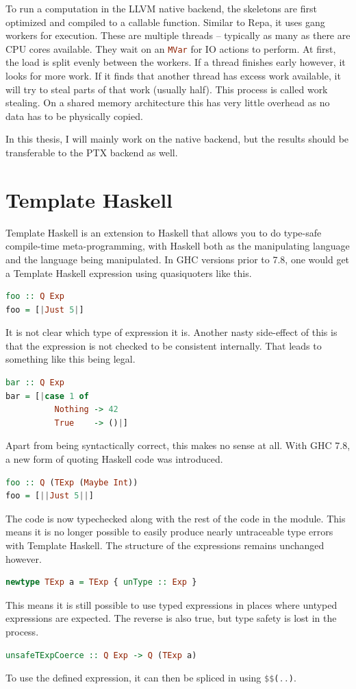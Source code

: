 \documentclass[a4paper,bibliography=totocnumbered,parskip,headsepline]{scrbook}
\begin{document}
To run a computation in the LLVM native backend, the skeletons are first optimized and compiled to a callable function.
Similar to Repa, it uses gang workers\cite{chakravarty2007data} for execution.
These are multiple threads -- typically as many as there are CPU cores available.
They wait on an \lstinline[language=haskell]!MVar! for IO actions to perform.
At first, the load is split evenly between the workers.
If a thread finishes early however, it looks for more work.
If it finds that another thread has excess work available, it will try to steal parts of that work (usually half).
This process is called work stealing.
On a shared memory architecture this has very little overhead as no data has to be physically copied.

In this thesis, I will mainly work on the native backend, but the results should be transferable to the PTX backend as well.

\section{Template Haskell}
Template Haskell is an extension to Haskell that allows you to do type-safe compile-time meta-programming, with Haskell both as the manipulating language and the language being manipulated.
In GHC versions prior to 7.8, one would get a Template Haskell expression using quasiquoters like this.
\begin{lstlisting}[language=haskell]
foo :: Q Exp
foo = [|Just 5|]
\end{lstlisting}
It is not clear which type of expression it is.
Another nasty side-effect of this is that the expression is not checked to be consistent internally.
That leads to something like this being legal.
\begin{lstlisting}[language=haskell]
bar :: Q Exp
bar = [|case 1 of
          Nothing -> 42
          True    -> ()|]
\end{lstlisting}
Apart from being syntactically correct, this makes no sense at all.
With GHC 7.8, a new form of quoting Haskell code was introduced.
\begin{lstlisting}[language=haskell]
foo :: Q (TExp (Maybe Int))
foo = [||Just 5||]
\end{lstlisting}
The code is now typechecked along with the rest of the code in the module.
This means it is no longer possible to easily produce nearly untraceable type errors with Template Haskell.
The structure of the expressions remains unchanged however.
\begin{lstlisting}[language=haskell]
newtype TExp a = TExp { unType :: Exp }
\end{lstlisting}
This means it is still possible to use typed expressions in places where untyped expressions are expected.
The reverse is also true, but type safety is lost in the process.
\begin{lstlisting}[language=haskell]
unsafeTExpCoerce :: Q Exp -> Q (TExp a)
\end{lstlisting}
To use the defined expression, it can then be spliced in using \lstinline[language=haskell]{$$(..)}.
\end{document}

